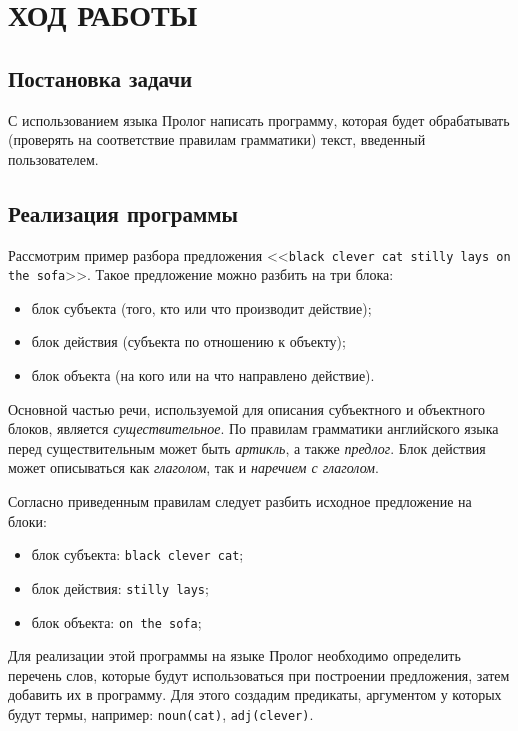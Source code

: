 \section{ХОД РАБОТЫ}

\subsection{Постановка задачи}

С использованием языка Пролог написать программу, которая будет
обрабатывать (проверять на соответствие правилам грамматики) текст,
введенный пользователем.

\subsection{Реализация программы}

Рассмотрим пример разбора предложения
<<\texttt{black clever cat stilly lays on the sofa}>>. Такое предложение
можно разбить на три блока:
\begin{itemize}
  \item блок субъекта (того, кто или что производит действие);
  \item блок действия (субъекта по отношению к объекту);
  \item блок объекта (на кого или на что направлено действие).
\end{itemize} 

Основной частью речи, используемой для описания субъектного и
объектного блоков, является \textit{существительное}. По правилам грамматики
английского языка перед существительным может быть \textit{артикль},
а также \textit{предлог}. 
Блок действия может описываться как \textit{глаголом},
так и \textit{наречием с глаголом}.

Согласно приведенным правилам следует разбить исходное предложение на блоки:
\begin{itemize}
  \item блок субъекта: \texttt{black clever cat};
  \item блок действия: \texttt{stilly lays};
  \item блок объекта:  \texttt{on the sofa};
\end{itemize}

Для реализации этой программы на языке Пролог необходимо определить
перечень слов, которые будут использоваться при построении предложения,
затем добавить их в программу. Для этого создадим предикаты,
аргументом у которых будут термы, например:
\texttt{noun(cat)}, \texttt{adj(clever)}.

